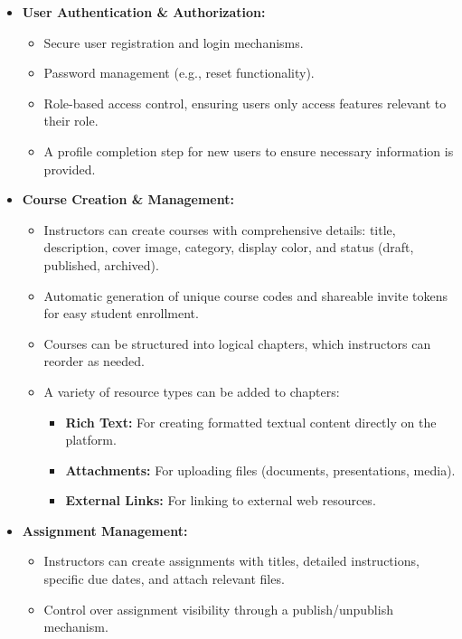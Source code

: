 \begin{itemize}
    \item \textbf{User Authentication \& Authorization:}
    \begin{itemize}
        \item Secure user registration and login mechanisms.
        \item Password management (e.g., reset functionality).
        \item Role-based access control, ensuring users only access features relevant to their role.
        \item A profile completion step for new users to ensure necessary information is provided.
    \end{itemize}
    \item \textbf{Course Creation \& Management:}
    \begin{itemize}
        \item Instructors can create courses with comprehensive details: title, description, cover image, category, display color, and status (draft, published, archived).
        \item Automatic generation of unique course codes and shareable invite tokens for easy student enrollment.
        \item Courses can be structured into logical chapters, which instructors can reorder as needed.
        \item A variety of resource types can be added to chapters:
        \begin{itemize}
            \item \textbf{Rich Text:} For creating formatted textual content directly on the platform.
            \item \textbf{Attachments:} For uploading files (documents, presentations, media).
            \item \textbf{External Links:} For linking to external web resources.
        \end{itemize}
    \end{itemize}
    \item \textbf{Assignment Management:}
    \begin{itemize}
        \item Instructors can create assignments with titles, detailed instructions, specific due dates, and attach relevant files.
        \item Control over assignment visibility through a publish/unpublish mechanism.
    \end{itemize}

\end{itemize}
